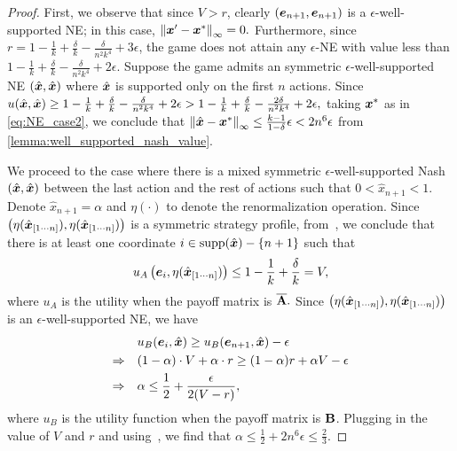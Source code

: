 \begin{proof}
    First, we observe that since $V > r$, clearly $({\bm{e}}_{n +1}, {\bm{e}}_{n + 1})$ is a $\epsilon$-well-supported NE; in this case, $\left\| {\bm{x}}' - {\bm{x}}^* \right\|_{\infty} = 0.$ Furthermore, since $r = 1 - \frac{1}{k} + \frac{\delta}{k} - \frac{\delta}{n^2k^4} + 3 \epsilon$, the game does not attain any $\epsilon$-NE with value less than $1 - \frac{1}{k} + \frac{\delta}{k} - \frac{\delta}{n^2k^4} + 2 \epsilon.$ Suppose the game admits an symmetric $\epsilon$-well-supported NE $(\hat{{\bm{x}}}, \hat{{\bm{x}}})$ where $\hat{{\bm{x}}}$ is supported only on the first $n$ actions. Since $u(\hat{{\bm{x}}}, \hat{{\bm{x}}}) \geq 1 - \frac{1}{k} + \frac{\delta}{k} - \frac{\delta}{n^2k^4} + 2 \epsilon > 1 - \frac{1}{k} + \frac{\delta}{k} - \frac{2\delta}{n^2k^4} + 2\epsilon,$ taking  ${\bm{x}}^*$ as in \eqref{eq:NE_case2}, we conclude that $\left\| \hat{{\bm{x}}} - {\bm{x}}^* \right\|_{\infty} \leq \frac{k - 1}{1 - \delta} \epsilon < 2n^6\epsilon$ from \cref{lemma:well_supported_nash_value}. 
    
     We proceed to the case where there is a mixed symmetric $\epsilon$-well-supported Nash $(\hat{{\bm{x}}}, \hat{{\bm{x}}})$ between the last action and the rest of actions such that $0 < \hat{x}_{n+1} < 1.$ Denote $\hat{x}_{n + 1} = \alpha$ and $\eta(\cdot)$ to denote the renormalization operation. Since $\left(\eta(\hat{{\bm{x}}}_{[1 \cdots n]}), \eta(\hat{{\bm{x}}}_{[1 \cdots n]})\right)$ is a symmetric strategy profile, from~\citet[Proposition 4]{MCLENNAN2010683}, we conclude that there is at least one coordinate $i \in \text{supp}(\hat{{\bm{x}}}) - \{n+1\}$ such that
     \begin{align*}
         u_A\left({\bm{e}}_i, \eta(\hat{{\bm{x}}}_{[1 \cdots n]})\right) \leq 1 - \frac{1}{k} + \frac{\delta}{k} = V,
     \end{align*}
     where $u_A$ is the utility when the payoff matrix is $\overline{\mathbf{A}}.$ Since $\left(\eta(\hat{{\bm{x}}}_{[1 \cdots n]}), \eta(\hat{{\bm{x}}}_{[1 \cdots n]})\right)$ is an $\epsilon$-well-supported NE, we have
     \begin{align}
         & u_B({\bm{e}}_i, \hat{{\bm{x}}}) \geq u_B({\bm{e}}_{n + 1}, \hat{{\bm{x}}}) - \epsilon \notag \\
         \Rightarrow \quad & (1 - \alpha)\cdot V + \alpha \cdot r \geq (1 - \alpha)r + \alpha V - \epsilon \notag \\
         \Rightarrow \quad & \alpha \leq \frac{1}{2} + \frac{\epsilon}{2(V - r)}, \label{eq:lower_bound_on_alpha}
     \end{align}
     where $u_B$ is the utility function when the payoff matrix is $\mathbf{B}$. Plugging in the value of $V$ and $r$ and using~, we find that $\alpha \leq \frac{1}{2} + 2n^6\epsilon \leq \frac{2}{3}$.
     

\end{proof}
